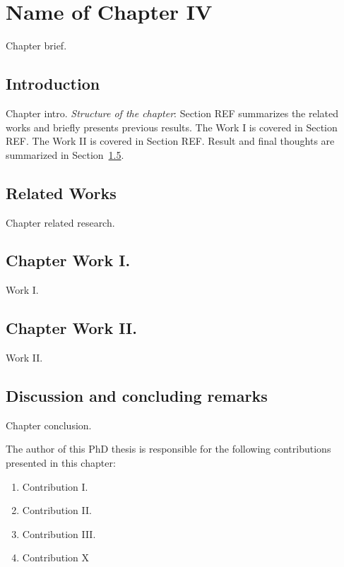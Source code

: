 \chapter{Name of Chapter IV}
\label{chapter_4}

Chapter brief.

\section{Introduction}
Chapter intro.
\textit{Structure of the chapter}: Section REF summarizes the related works and briefly presents previous results. The Work I is covered in Section REF. The Work II is covered in Section REF. Result and final thoughts are summarized in Section~\ref{ch4:contrib}.
\section{Related Works}
Chapter related research.

\section{Chapter Work I.}
Work I. \cite{b:arrl}
\section{Chapter Work II.}
Work II. \cite{b:duckworth99}
\section{Discussion and concluding remarks}
\label{ch4:contrib}

Chapter conclusion.

The author of this PhD thesis is responsible for the following contributions presented in this chapter:
\begin{enumerate}[wide = 0pt, widest = {II/5.}, leftmargin =*]
	\item[II/1.] Contribution I.
	
    \item[II/2.] Contribution II.
	
    \item[II/3.] Contribution III.
	
    \item[II/4.] Contribution X
\end{enumerate}